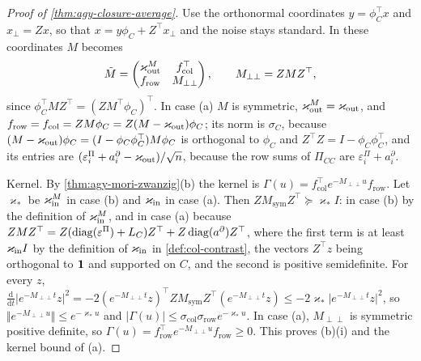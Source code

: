 \begin{proof}[Proof of \cref{thm:agy-closure-average}]
Use the orthonormal coordinates $y=\phi_C^\top x$ and $x_\perp=Zx$, so that $x=y\phi_C+Z^\top x_\perp$ and the noise stays standard. In these coordinates $M$ becomes
\begin{equation*}
\tilde M=\begin{pmatrix}\varkappa_{\mathrm{out}}^M&f_{\mathrm{col}}^\top\\f_{\mathrm{row}}&M_{\perp\perp}\end{pmatrix},\qquad M_{\perp\perp}=ZMZ^\top,
\end{equation*}
since $\phi_C^\top MZ^\top=(ZM^\top\phi_C)^\top$. In case (a) $M$ is symmetric, $\varkappa_{\mathrm{out}}^M=\varkappa_{\mathrm{out}}$, and $f_{\mathrm{row}}=f_{\mathrm{col}}=ZM\phi_C=Z(M-\varkappa_{\mathrm{out}})\phi_C$; its norm is $\sigma_C$, because $(M-\varkappa_{\mathrm{out}})\phi_C=(I-\phi_C\phi_C^\top)M\phi_C$ is orthogonal to $\phi_C$ and $Z^\top Z=I-\phi_C\phi_C^\top$, and its entries are $(\varepsilon^\Pi_i+a^\partial_i-\varkappa_{\mathrm{out}})/\sqrt n$, because the row sums of $\Pi_{CC}$ are $\varepsilon^\Pi_i+a^\partial_i$.

Kernel. By \cref{thm:agy-mori-zwanzig}(b) the kernel is $\Gamma(u)=f_{\mathrm{col}}^\top e^{-M_{\perp\perp}u}f_{\mathrm{row}}$. Let $\varkappa_\ast$ be $\varkappa_{\mathrm{in}}^M$ in case (b) and $\varkappa_{\mathrm{in}}$ in case (a). Then $ZM_{\mathrm{sym}}Z^\top\succeq\varkappa_\ast I$: in case (b) by the definition of $\varkappa_{\mathrm{in}}^M$, and in case (a) because $ZMZ^\top=Z(\operatorname{diag}(\varepsilon^\Pi)+L_C)Z^\top+Z\operatorname{diag}(a^\partial)Z^\top$, where the first term is at least $\varkappa_{\mathrm{in}} I$ by the definition of $\varkappa_{\mathrm{in}}$ in \cref{def:col-contrast}, the vectors $Z^\top z$ being orthogonal to $\mathbf{1}$ and supported on $C$, and the second is positive semidefinite. For every $z$, $\frac{\mathrm d}{\mathrm dt}\lvert e^{-M_{\perp\perp}t}z\rvert^2=-2(e^{-M_{\perp\perp}t}z)^\top ZM_{\mathrm{sym}}Z^\top(e^{-M_{\perp\perp}t}z)\le-2\varkappa_\ast\lvert e^{-M_{\perp\perp}t}z\rvert^2$, so $\Vert e^{-M_{\perp\perp}u}\Vert\le e^{-\varkappa_\ast u}$ and $\lvert\Gamma(u)\rvert\le\sigma_{\mathrm{col}}\sigma_{\mathrm{row}}e^{-\varkappa_\ast u}$. In case (a), $M_{\perp\perp}$ is symmetric positive definite, so $\Gamma(u)=f_{\mathrm{row}}^\top e^{-M_{\perp\perp}u}f_{\mathrm{row}}\ge0$. This proves (b)(i) and the kernel bound of (a).


\end{proof}
